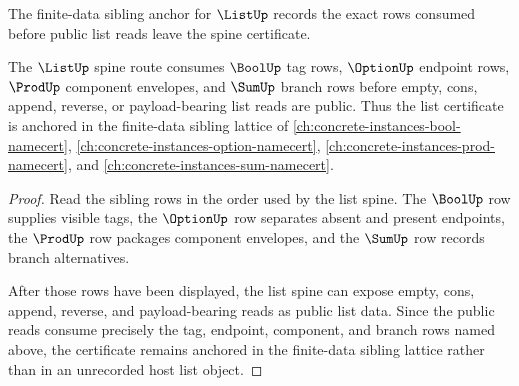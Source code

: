 The finite-data sibling anchor for $\ListUp$ records the exact rows consumed before public list reads leave the spine certificate.

\begin{theorem}
\label{thm:list-finite-data-sibling-anchor}
The $\ListUp$ spine route consumes $\BoolUp$ tag rows, $\OptionUp$ endpoint rows, $\ProdUp$ component envelopes, and $\SumUp$ branch rows before empty, cons, append, reverse, or payload-bearing list reads are public. Thus the list certificate is anchored in the finite-data sibling lattice of \autoref{ch:concrete-instances-bool-namecert}, \autoref{ch:concrete-instances-option-namecert}, \autoref{ch:concrete-instances-prod-namecert}, and \autoref{ch:concrete-instances-sum-namecert}.
\end{theorem}
\begin{proof}
Read the sibling rows in the order used by the list spine. The $\BoolUp$ row supplies visible tags, the $\OptionUp$ row separates absent and present endpoints, the $\ProdUp$ row packages component envelopes, and the $\SumUp$ row records branch alternatives.

After those rows have been displayed, the list spine can expose empty, cons, append, reverse, and payload-bearing reads as public list data. Since the public reads consume precisely the tag, endpoint, component, and branch rows named above, the certificate remains anchored in the finite-data sibling lattice rather than in an unrecorded host list object.
\end{proof}
